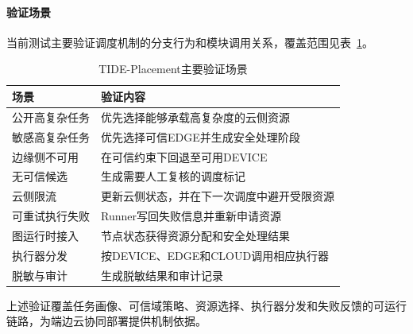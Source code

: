 \paragraph{验证场景}

当前测试主要验证调度机制的分支行为和模块调用关系，覆盖范围见表~\ref{tab:placement-validation}。


\begin{table}[htbp]
    \centering
    \caption{TIDE-Placement主要验证场景}
    \label{tab:placement-validation}
    \begin{tabularx}{\textwidth}{p{}X}
        \toprule
        场景 & 验证内容 \\
        \midrule
        公开高复杂任务
        & 优先选择能够承载高复杂度的云侧资源 \\

        敏感高复杂任务
        & 优先选择可信EDGE并生成安全处理阶段 \\

        边缘侧不可用
        & 在可信约束下回退至可用DEVICE \\

        无可信候选
        & 生成需要人工复核的调度标记 \\

        云侧限流
        & 更新云侧状态，并在下一次调度中避开受限资源 \\

        可重试执行失败
        & Runner写回失败信息并重新申请资源 \\

        图运行时接入
        & 节点状态获得资源分配和安全处理结果 \\

        执行器分发
        & 按DEVICE、EDGE和CLOUD调用相应执行器 \\

        脱敏与审计
        & 生成脱敏结果和审计记录 \\
        \bottomrule
    \end{tabularx}
\end{table}

上述验证覆盖任务画像、可信域策略、资源选择、执行器分发和失败反馈的可运行链路，为端边云协同部署提供机制依据。



